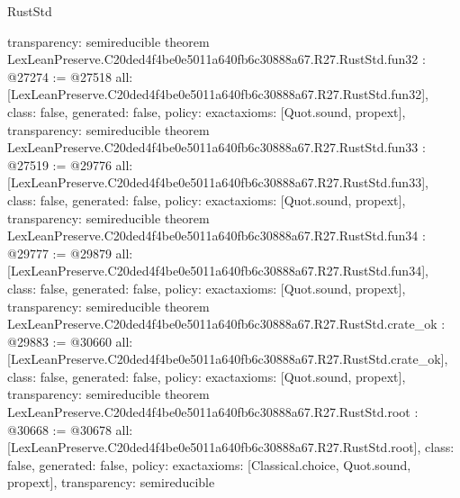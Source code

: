 \begin{lexlean}{RustStd}
\begin{coremodule}
{  transparency: semireducible
}
theorem LexLeanPreserve.C20ded4f4be0e5011a640fb6c30888a67.R27.RustStd.fun32 : @27274 := @27518 {
  all: [LexLeanPreserve.C20ded4f4be0e5011a640fb6c30888a67.R27.RustStd.fun32],
  class: false,
  generated: false,
  policy: exact{axioms: [Quot.sound, propext]},
  transparency: semireducible
}
theorem LexLeanPreserve.C20ded4f4be0e5011a640fb6c30888a67.R27.RustStd.fun33 : @27519 := @29776 {
  all: [LexLeanPreserve.C20ded4f4be0e5011a640fb6c30888a67.R27.RustStd.fun33],
  class: false,
  generated: false,
  policy: exact{axioms: [Quot.sound, propext]},
  transparency: semireducible
}
theorem LexLeanPreserve.C20ded4f4be0e5011a640fb6c30888a67.R27.RustStd.fun34 : @29777 := @29879 {
  all: [LexLeanPreserve.C20ded4f4be0e5011a640fb6c30888a67.R27.RustStd.fun34],
  class: false,
  generated: false,
  policy: exact{axioms: [Quot.sound, propext]},
  transparency: semireducible
}
theorem LexLeanPreserve.C20ded4f4be0e5011a640fb6c30888a67.R27.RustStd.crate_ok : @29883 := @30660 {
  all: [LexLeanPreserve.C20ded4f4be0e5011a640fb6c30888a67.R27.RustStd.crate_ok],
  class: false,
  generated: false,
  policy: exact{axioms: [Quot.sound, propext]},
  transparency: semireducible
}
theorem LexLeanPreserve.C20ded4f4be0e5011a640fb6c30888a67.R27.RustStd.root : @30668 := @30678 {
  all: [LexLeanPreserve.C20ded4f4be0e5011a640fb6c30888a67.R27.RustStd.root],
  class: false,
  generated: false,
  policy: exact{axioms: [Classical.choice, Quot.sound, propext]},
  transparency: semireducible
}


\end{coremodule}
\end{lexlean}
